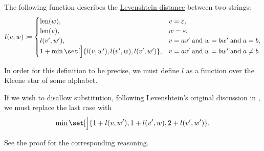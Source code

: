 \begin{proposition}\label{thm:levenshtein_distance_characterization}
  The following function describes the \hyperref[def:levenshtein_distance]{Levenshtein distance} between two strings:
  \begin{equation}\label{eq:thm:levenshtein_distance_characterization}
    l(v, w) \coloneqq \begin{cases}
      \len(w),                                             &v = \varepsilon, \\
      \len(v),                                             &w = \varepsilon, \\
      l(v', w'),                                           &v = av' \T{and} w = bw' \T{and} a = b, \\
      1 + \min\set[\Big]{ l(v, w'), l(v', w), l(v', w') }, &v = av' \T{and} w = bw' \T{and} a \neq b.
    \end{cases}
  \end{equation}
\end{proposition}
\begin{comments}
  \item In order for this definition to be precise, we must define \( l \) as a function over the Kleene star of some alphabet.
  \item If we wish to disallow substitution, following Levenshtein's original discussion in \cite[2]{Левенштейн1965ДвоичныеКоды}, we must replace the last case with
  \begin{equation*}
    \min\set[\Big]{ 1 + l(v, w'), 1 + l(v', w), 2 + l(v', w') }.
  \end{equation*}

  See the proof for the corresponding reasoning.
\end{comments}
